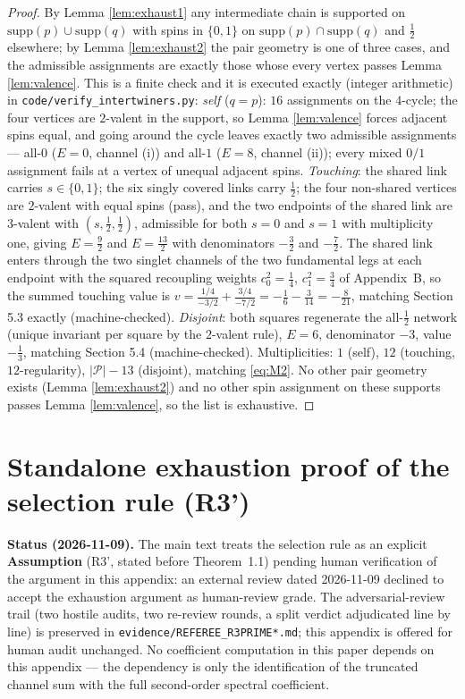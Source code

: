 \begin{proof}
By Lemma \ref{lem:exhaust1} any intermediate chain is supported on
$\mathrm{supp}(p)\cup\mathrm{supp}(q)$ with spins in $\{0,1\}$ on
$\mathrm{supp}(p)\cap\mathrm{supp}(q)$ and $\tfrac12$ elsewhere; by
Lemma \ref{lem:exhaust2} the pair geometry is one of three cases, and the
admissible assignments are exactly those whose every vertex passes
Lemma \ref{lem:valence}. This is a finite check and it is executed exactly
(integer arithmetic) in \texttt{code/verify\_intertwiners.py}:
\emph{self} ($q=p$): $16$ assignments on the $4$-cycle; the four vertices
are $2$-valent in the support, so Lemma \ref{lem:valence} forces adjacent
spins equal, and going around the cycle leaves exactly two admissible
assignments --- all-$0$ ($E=0$, channel (i)) and all-$1$ ($E=8$, channel
(ii)); every mixed $0/1$ assignment fails at a vertex of unequal adjacent
spins.
\emph{Touching}: the shared link carries $s\in\{0,1\}$; the six singly
covered links carry $\tfrac12$; the four non-shared vertices are $2$-valent
with equal spins (pass), and the two endpoints of the shared link are
$3$-valent with $(s,\tfrac12,\tfrac12)$, admissible for both $s=0$ and
$s=1$ with multiplicity one, giving $E=\tfrac92$ and $E=\tfrac{13}{2}$
with denominators $-\tfrac32$ and $-\tfrac72$. The shared link enters
through the two singlet channels of the two fundamental legs at each
endpoint with the squared recoupling weights $c_0^2=\tfrac14$,
$c_1^2=\tfrac34$ of Appendix~B, so the summed touching value is
$v=\tfrac{1/4}{-3/2}+\tfrac{3/4}{-7/2}=-\tfrac16-\tfrac{3}{14}
=-\tfrac{8}{21}$, matching Section 5.3 exactly (machine-checked).
\emph{Disjoint}: both squares regenerate the all-$\tfrac12$ network
(unique invariant per square by the $2$-valent rule), $E=6$, denominator
$-3$, value $-\tfrac13$, matching Section 5.4 (machine-checked).
Multiplicities: $1$ (self), $12$ (touching, $12$-regularity),
$|\mathcal P|-13$ (disjoint), matching \eqref{eq:M2}. No other pair
geometry exists (Lemma \ref{lem:exhaust2}) and no other spin assignment on
these supports passes Lemma \ref{lem:valence}, so the list is exhaustive.
\end{proof}

\section{Standalone exhaustion proof of the selection rule (R3')}
\label{app:G}

\textbf{Status (2026-11-09).} The main text treats the selection rule as an
explicit \textbf{Assumption} (R3', stated before Theorem~1.1) pending human
verification of the argument in this appendix: an external review dated
2026-11-09 declined to accept the exhaustion argument as human-review grade.
The adversarial-review trail (two hostile audits, two re-review rounds, a
split verdict adjudicated line by line) is preserved in
\texttt{evidence/REFEREE\_R3PRIME*.md}; this appendix is offered for human
audit unchanged. No coefficient computation in this paper depends on this
appendix --- the dependency is only the identification of the truncated
channel sum with the full second-order spectral coefficient.

